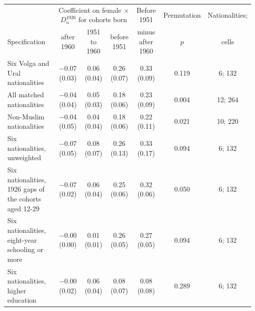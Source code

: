 \begin{tabular}{lcccccc}
\toprule
 & \multicolumn{3}{c}{Coefficient on female $\times$ $D^{1926}_n$ for cohorts born} & Before 1951 & Permutation & Nationalities; \\
\cmidrule(lr){2-4}
Specification & after 1960 & 1951 to 1960 & before 1951 & minus after 1960 & $p$ & cells \\
\midrule
Six Volga and Ural nationalities & $-$0.07 (0.03) & 0.06 (0.04) & 0.26 (0.07) & 0.33 (0.09) & 0.119 & 6; 132 \\
All matched nationalities & $-$0.04 (0.04) & 0.05 (0.03) & 0.18 (0.06) & 0.23 (0.09) & 0.004 & 12; 264 \\
Non-Muslim nationalities & $-$0.04 (0.05) & 0.04 (0.04) & 0.18 (0.06) & 0.22 (0.11) & 0.021 & 10; 220 \\
Six nationalities, unweighted & $-$0.07 (0.05) & 0.08 (0.07) & 0.26 (0.13) & 0.33 (0.17) & 0.094 & 6; 132 \\
Six nationalities, 1926 gaps of the cohorts aged 12-29 & $-$0.07 (0.02) & 0.06 (0.04) & 0.25 (0.06) & 0.32 (0.06) & 0.050 & 6; 132 \\
Six nationalities, eight-year schooling or more & $-$0.00 (0.00) & 0.01 (0.01) & 0.26 (0.05) & 0.27 (0.05) & 0.094 & 6; 132 \\
Six nationalities, higher education & $-$0.00 (0.02) & 0.06 (0.04) & 0.08 (0.07) & 0.08 (0.08) & 0.289 & 6; 132 \\
\bottomrule
\end{tabular}
